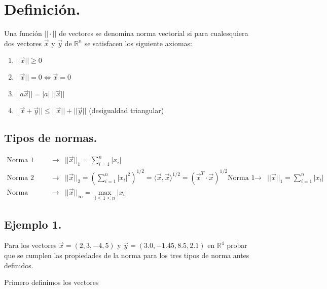 \documentclass[
  letterpaper,
  DIV=11,
  numbers=noendperiod]{scrreprt}
\providecommand{\tightlist}{%
  \setlength{\itemsep}{0pt}\setlength{\parskip}{0pt}}\usepackage{longtable,booktabs,array}
\begin{document}

\chapter{Definición.}\label{definiciuxf3n.}

Una función \(||\cdot ||\) de vectores se denomina norma vectorial si
para cualesquiera dos vectores \(\vec{x}\) y \(\vec{y}\) de
\(\mathbb{R}^n\) se satisfacen los siguiente axiomas:

\begin{enumerate}
\def\labelenumi{\arabic{enumi}.}
\tightlist
\item
  \(||\vec{x} || \ge 0\)
\item
  \(||\vec{x} || = 0 \iff \vec{x} = 0\)
\item
  \(||a\vec{x} || = |a| \; || \vec{x} ||\)
\item
  \(||\vec{x} + \vec{y}|| \le ||\vec{x} || + ||\vec{y}||\) (desigualdad
  triangular)
\end{enumerate}

\section{Tipos de normas.}\label{tipos-de-normas.}

\[
\begin{array}{lcl}
\text{Norma 1} & \rightarrow & ||\vec{x}||_1 = \sum_{i=1}^n |x_i|  \\
\text{Norma 2 (Euclideana)} & \rightarrow & ||\vec{x}||_2 = \left( \sum_{i=1}^n |x_i|^2 \right)^{1/2} = \langle \vec{x}, \vec{x} \rangle^{1/2} = (\vec{x}^T \cdot \vec{x})^{1/2}
\text{Norma 1} & \rightarrow & ||\vec{x}||_1 = \sum_{i=1}^n |x_i|  \\
\text{Norma Infinito} & \rightarrow & ||\vec{x}||_\infty = \max_{i \le 1 \le n} |x_i|
\end{array}
\]

\section{\texorpdfstring{\textbf{Ejemplo
1.}}{Ejemplo 1.}}\label{ejemplo-1.-1}

Para los vectores \(\vec{x} = (2, 3, -4, 5)\) y
\(\vec{y} = (3.0, -1.45, 8.5, 2.1)\) en \(\mathbb{R}^4\) probar que se
cumplen las propiedades de la norma para los tres tipos de norma antes
definidos.

Primero definimos los vectores
\end{document}
